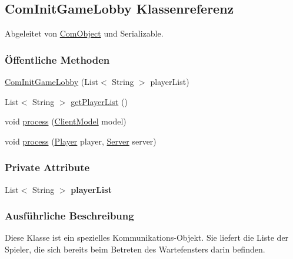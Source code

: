 \hypertarget{a00031}{\subsection{Com\-Init\-Game\-Lobby Klassenreferenz}
\label{a00031}
}


Abgeleitet von \hyperlink{a00037}{Com\-Object} und Serializable.

\subsubsection*{Öffentliche Methoden}
\begin{DoxyCompactItemize}
\item 
\hyperlink{a00031_a6bd6086583fdd9b6fc25d1aabb9f1312}{Com\-Init\-Game\-Lobby} (List$<$ String $>$ player\-List)
\item 
List$<$ String $>$ \hyperlink{a00031_a806a371665b36cee69f0a49625a8c20d}{get\-Player\-List} ()
\item 
void \hyperlink{a00031_a758d7005755a181717f238f714d87dd2}{process} (\hyperlink{a00003}{Client\-Model} model)
\item 
void \hyperlink{a00031_ac67b5ce3ec03d48ef1e6caad6e49c902}{process} (\hyperlink{a00076}{Player} player, \hyperlink{a00077}{Server} server)
\end{DoxyCompactItemize}
\subsubsection*{Private Attribute}
\begin{DoxyCompactItemize}
\item 
\hypertarget{a00031_a2a62caed4423183b9e69deb6560b136f}{List$<$ String $>$ {\bfseries player\-List}}\label{a00031_a2a62caed4423183b9e69deb6560b136f}

\end{DoxyCompactItemize}


\subsubsection{Ausführliche Beschreibung}
Diese Klasse ist ein spezielles Kommunikations-\/\-Objekt. Sie liefert die Liste der Spieler, die sich bereits beim Betreten des Wartefensters darin befinden. 

